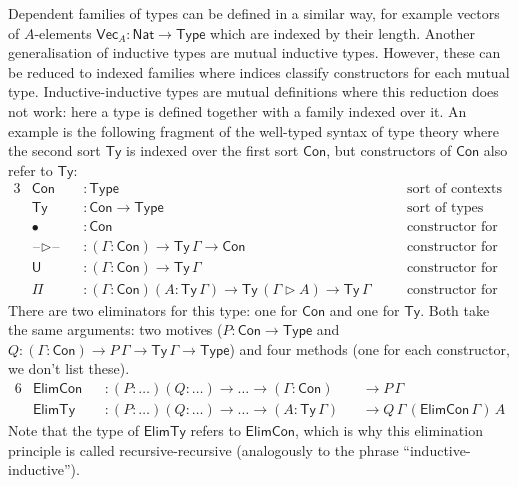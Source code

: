 \documentclass[a4paper,UKenglish]{lipics-v2018}
\newcommand{\U}{\mathsf{U}}
\newcommand{\ra}{\rightarrow}
\newcommand{\Con}{\mathsf{Con}}
\newcommand{\Ty}{\mathsf{Ty}}
\newcommand{\Nat}{\mathsf{Nat}}
\newcommand{\blank}{\mathord{\hspace{1pt}\text{--}\hspace{1pt}}} %
\newcommand{\Elim}{\mathsf{Elim}}
\newcommand{\1}{\mathsf{1}} \renewcommand{\Pr}{\mathsf{Pr}}
\begin{document}
Dependent families of types can be defined in a similar way, for
example vectors of $A$-elements $\mathsf{Vec}_A: \Nat \ra \mathsf{Type}$ which
are indexed by their length. Another generalisation of inductive types
are mutual inductive types. However, these can be reduced to indexed
families where indices classify constructors for each mutual type.
Inductive-inductive types \cite{forsberg-phd} are mutual definitions
where this reduction does not work: here a type is defined together
with a family indexed over it. An example is the following fragment of
the well-typed syntax of type theory where the second sort $\Ty$ is
indexed over the first sort $\Con$, but constructors of $\Con$ also
refer to $\Ty$:
\begin{alignat*}{3}
  & \Con && : \mathsf{Type} && \text{sort of contexts} \\
  & \Ty  && : \Con \ra \mathsf{Type} && \text{sort of types given a context} \\
  & \bullet && : \Con && \text{constructor for the empty context} \\
  & \blank\rhd\blank && : (\Gamma:\Con)\ra\Ty\,\Gamma\ra\Con && \text{constructor for context extension} \\
  & \U && : (\Gamma:\Con)\ra\Ty\,\Gamma && \text{constructor for a base type} \\
  & \Pi && : (\Gamma:\Con)(A:\Ty\,\Gamma)\ra\Ty\,(\Gamma\rhd A)\ra\Ty\,\Gamma \hspace{1em} && \text{constructor for dependent functions}
\end{alignat*}
There are two eliminators for this type: one for $\Con$ and one for
$\Ty$. Both take the same arguments: two motives ($P:\Con\ra\mathsf{Type}$ and
$Q:(\Gamma:\Con)\ra P\,\Gamma\ra\Ty\,\Gamma\ra\mathsf{Type}$) and four methods
(one for each constructor, we don't list these).
\begin{alignat*}{6}
  & \Elim\Con && : (P:\dots)(Q:\dots)\ra\dots\ra(\Gamma:\Con) && \ra P\,\Gamma \\
  & \Elim\Ty  && : (P:\dots)(Q:\dots)\ra\dots\ra(A:\Ty\,\Gamma) && \ra Q\,\Gamma\,(\Elim\Con\,\Gamma)\,A
\end{alignat*}
Note that the type of $\Elim\Ty$ refers to $\Elim\Con$, which is why
this elimination principle is called recursive-recursive (analogously
to the phrase ``inductive-inductive'').
\end{document}
